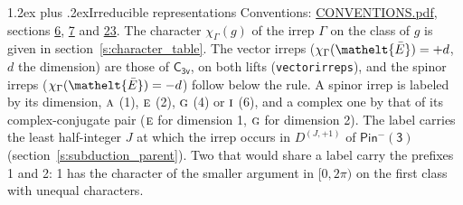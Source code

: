 \documentclass[10pt,a4paper]{article}
\makeatletter
\renewcommand\section{\@startsection{section}{1}{\z@}{-3ex plus -1ex minus -.2ex}%
  {1.2ex plus .2ex}{\normalfont\large\sffamily\bfseries\color{parttitle}}}
\numberwithin{equation}{section}
\newcommand{\eltfont}[1]{{\let\sigma\eltsigma\mathelt{#1}}}
\newcommand{\grp}[1]{\mathsf{#1}}
\newcommand{\irr}[1]{\text{\normalfont\scshape #1}}
\newcommand{\elt}[1]{\eltfont{#1}}
\newcommand{\irrJp}[2]{D^{(#1,#2)}}
\newcommand{\irchar}[1]{\chi_{#1}}
\newcommand{\barred}[1]{\bar{#1}}
\makeatother
\begin{document}
\section{Irreducible representations}\label{s:irreps}
Conventions: \href{../../CONVENTIONS.pdf}{CONVENTIONS.pdf}, sections \href{../../../rotation/CONVENTIONS.pdf\#conv.6}{6}, \href{../../../rotation/CONVENTIONS.pdf\#conv.7}{7} and \href{../../CONVENTIONS.pdf\#conv.23}{23}.
\leavevmode\label{n:function.character}\label{n:irrep.Gamma}The character $\irchar{\Gamma}(g)$ of the irrep $\Gamma$ on the class of $g$ is given in section~\ref{s:character_table}. \label{n:index.dimension}The vector irreps ($\irchar{\Gamma}(\elt{\barred{E}}) = +d$, $d$ the dimension) are those of \href{../../../rotation/data/pdf/C3v.pdf}{$\grp{C_{3v}}$}, on both lifts (\texttt{vectorirreps}), and the spinor irreps ($\irchar{\Gamma}(\elt{\barred{E}}) = -d$) follow below the rule. A spinor irrep is labeled by its dimension, $\irr{a}$ (1), $\irr{e}$ (2), $\irr{g}$ (4) or $\irr{i}$ (6), and a complex one by that of its complex-conjugate pair ($\irr{e}$ for dimension 1, $\irr{g}$ for dimension 2). The label carries the least half-integer $J$ at which the irrep occurs in $\irrJp{J}{+1}$ of $\grp{Pin^{-}(3)}$ (section~\ref{s:subduction_parent}). Two that would share a label carry the prefixes 1 and 2: 1 has the character of the smaller argument in $[0, 2\pi)$ on the first class with unequal characters.
\end{document}
